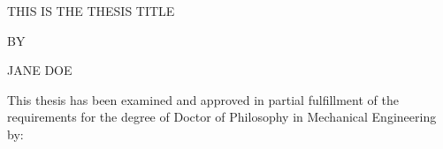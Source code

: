 \documentclass[12pt]{unhthesis}
\begin{document}
\thispagestyle{empty}

\begin{center}
    THIS IS THE THESIS TITLE
    \vspace{6mm}

    BY
    \vspace{6mm}

    JANE DOE
    \vspace{6mm}
\end{center}

\noindent \small{This thesis has been examined and approved in partial
fulfillment of the requirements for the degree of Doctor of Philosophy in
Mechanical Engineering by:}

\begin{tabular}{l}

\end{tabular}
\end{document}
